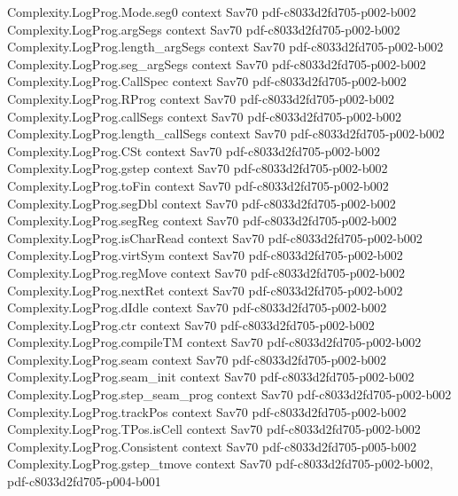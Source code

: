 \begin{theorem}
  {Complexity.LogProg.Mode.seg0}
  {context}
  {Sav70}
  {pdf-c8033d2fd705-p002-b002}
\proofstep
  {Complexity.LogProg.argSegs}
  {context}
  {Sav70}
  {pdf-c8033d2fd705-p002-b002}
\proofstep
  {Complexity.LogProg.length_argSegs}
  {context}
  {Sav70}
  {pdf-c8033d2fd705-p002-b002}
\proofstep
  {Complexity.LogProg.seg_argSegs}
  {context}
  {Sav70}
  {pdf-c8033d2fd705-p002-b002}
\proofstep
  {Complexity.LogProg.CallSpec}
  {context}
  {Sav70}
  {pdf-c8033d2fd705-p002-b002}
\proofstep
  {Complexity.LogProg.RProg}
  {context}
  {Sav70}
  {pdf-c8033d2fd705-p002-b002}
\proofstep
  {Complexity.LogProg.callSegs}
  {context}
  {Sav70}
  {pdf-c8033d2fd705-p002-b002}
\proofstep
  {Complexity.LogProg.length_callSegs}
  {context}
  {Sav70}
  {pdf-c8033d2fd705-p002-b002}
\proofstep
  {Complexity.LogProg.CSt}
  {context}
  {Sav70}
  {pdf-c8033d2fd705-p002-b002}
\proofstep
  {Complexity.LogProg.gstep}
  {context}
  {Sav70}
  {pdf-c8033d2fd705-p002-b002}
\proofstep
  {Complexity.LogProg.toFin}
  {context}
  {Sav70}
  {pdf-c8033d2fd705-p002-b002}
\proofstep
  {Complexity.LogProg.segDbl}
  {context}
  {Sav70}
  {pdf-c8033d2fd705-p002-b002}
\proofstep
  {Complexity.LogProg.segReg}
  {context}
  {Sav70}
  {pdf-c8033d2fd705-p002-b002}
\proofstep
  {Complexity.LogProg.isCharRead}
  {context}
  {Sav70}
  {pdf-c8033d2fd705-p002-b002}
\proofstep
  {Complexity.LogProg.virtSym}
  {context}
  {Sav70}
  {pdf-c8033d2fd705-p002-b002}
\proofstep
  {Complexity.LogProg.regMove}
  {context}
  {Sav70}
  {pdf-c8033d2fd705-p002-b002}
\proofstep
  {Complexity.LogProg.nextRet}
  {context}
  {Sav70}
  {pdf-c8033d2fd705-p002-b002}
\proofstep
  {Complexity.LogProg.dIdle}
  {context}
  {Sav70}
  {pdf-c8033d2fd705-p002-b002}
\proofstep
  {Complexity.LogProg.ctr}
  {context}
  {Sav70}
  {pdf-c8033d2fd705-p002-b002}
\proofstep
  {Complexity.LogProg.compileTM}
  {context}
  {Sav70}
  {pdf-c8033d2fd705-p002-b002}
\proofstep
  {Complexity.LogProg.seam}
  {context}
  {Sav70}
  {pdf-c8033d2fd705-p002-b002}
\proofstep
  {Complexity.LogProg.seam_init}
  {context}
  {Sav70}
  {pdf-c8033d2fd705-p002-b002}
\proofstep
  {Complexity.LogProg.step_seam_prog}
  {context}
  {Sav70}
  {pdf-c8033d2fd705-p002-b002}
\proofstep
  {Complexity.LogProg.trackPos}
  {context}
  {Sav70}
  {pdf-c8033d2fd705-p002-b002}
\proofstep
  {Complexity.LogProg.TPos.isCell}
  {context}
  {Sav70}
  {pdf-c8033d2fd705-p002-b002}
\proofstep
  {Complexity.LogProg.Consistent}
  {context}
  {Sav70}
  {pdf-c8033d2fd705-p005-b002}
\proofstep
  {Complexity.LogProg.gstep_tmove}
  {context}
  {Sav70}
  {pdf-c8033d2fd705-p002-b002,
    pdf-c8033d2fd705-p004-b001}

\end{theorem}
